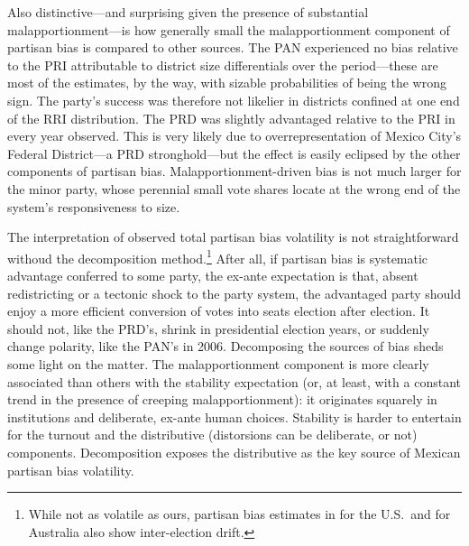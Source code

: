 \documentclass[letter,12pt]{article}
\begin{document}
{Also distinctive---and surprising given the presence of substantial malapportionment---is how generally small the malapportionment component of partisan bias is compared to other sources. The PAN experienced no bias relative to the PRI attributable to district size differentials over the period---these are most of the estimates, by the way, with sizable probabilities of being the wrong sign. The party's success was therefore not likelier in districts confined at one end of the RRI distribution. The PRD was slightly advantaged relative to the PRI in every year observed. This is very likely due to overrepresentation of Mexico City's Federal District---a PRD stronghold---but the effect is easily eclipsed by the other components of partisan bias. \citep[The drop from +.12 to +.05 between 2003 and 2006 actually coincides with reapportionment and the accessory reduction---not removal---of the capital's overrepresentation in Congress, see][.]{altman.magar.mcd.trelles2014apsa} Malapportionment-driven bias is not much larger for the minor party, whose perennial small vote shares locate at the wrong end of the system's responsiveness to size. 


The interpretation of observed total partisan bias volatility is not straightforward withoud the decomposition method.\footnote{While not as volatile as ours, partisan bias estimates in \citet{gelman.king.1994EvalElSysRedis} for the U.S.\ and \citet{jackmanMeasuringBias1994} for Australia also show inter-election drift.} After all, if partisan bias is systematic advantage conferred to some party, the ex-ante expectation is that, absent redistricting or a tectonic shock to the party system, the advantaged party should enjoy a more efficient conversion of votes into seats election after election. It should not, like the PRD's, shrink in presidential election years, or suddenly change polarity, like the PAN's in 2006. Decomposing the sources of bias sheds some light on the matter. The malapportionment component is more clearly associated than others with the stability expectation (or, at least, with a constant trend in the presence of creeping malapportionment): it originates squarely in institutions and deliberate, ex-ante human choices. Stability is harder to entertain for the turnout \citep[mobilization has an endogenous component,][]{cox.munger.1989,rosenstone.hansen.1993} and the distributive (distorsions can be deliberate, or not) components. Decomposition exposes the distributive as the key source of Mexican partisan bias volatility.

}
\end{document}
